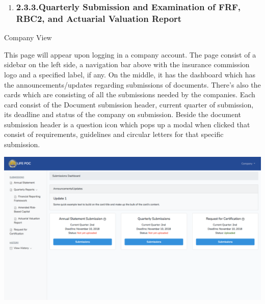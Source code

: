 \documentclass{article}
\begin{document}
\begin{enumerate}[noitemsep,topsep=\mdcompacttopsep]%

\item{}
\subsubsection{2.3.3.\hspace*{0.5em}Quarterly Submission and Examination of FRF, RBC2, and Actuarial Valuation Report}\label{sec-quarterly-submission-and-examination-of-frf-rbc2-and-actuarial-valuation-report}%
\end{enumerate}%

\noindent{}Company View%

This page will appear upon logging in a company
account. The page consist of a sidebar on the left side, a navigation
bar above with the insurance commission logo and a specified label, if
any. On the middle, it has the dashboard which has the
announcements/updates regarding submissions of documents. There's also
the cards which are consisting of all the submissions needed by the
companies. Each card consist of the Document submission header, current
quarter of submission, its deadline and status of the company on
submission. Beside the document submission header is a question icon
which pops up a modal when clicked that consist of requirements,
guidelines and circular letters for that specific submission.%

\includegraphics[keepaspectratio=true]{up-ic-screens/image148}{}%

\mdhr{}%
\end{document}
